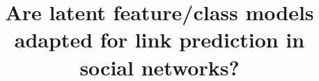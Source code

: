 \documentclass[journal]{IEEEtran}
\title{Are latent feature/class models adapted for link prediction in social networks?}
\begin{document}
	
\maketitle
\begin{abstract}
\end{abstract}

\IEEEpeerreviewmaketitle




%







%




\appendix

\end{document}
